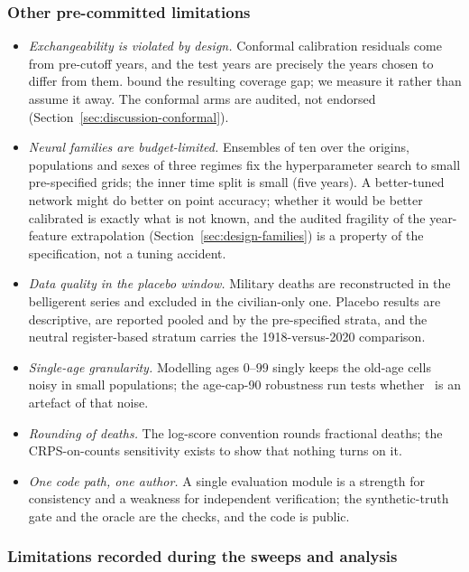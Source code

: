 \subsubsection{Other pre-committed limitations}

\begin{itemize}
\item \emph{Exchangeability is violated by design.} Conformal calibration
  residuals come from pre-cutoff years, and the test years are precisely
  the years chosen to differ from them. \citet{barber2023conformal} bound
  the resulting coverage gap; we measure it rather than assume it away.
  The conformal arms are audited, not endorsed
  (Section~\ref{sec:discussion-conformal}).
\item \emph{Neural families are budget-limited.} Ensembles of ten over
  the origins, populations and sexes of three regimes fix the
  hyperparameter search to small pre-specified grids; the inner time split
  is small (five years). A better-tuned network might do better on point
  accuracy; whether it would be better calibrated is exactly what is not
  known, and the audited fragility of the year-feature extrapolation
  (Section~\ref{sec:design-families}) is a property of the specification,
  not a tuning accident.
\item \emph{Data quality in the placebo window.} Military deaths are
  reconstructed in the belligerent series and excluded in the
  civilian-only one. Placebo results are descriptive, are reported pooled
  and by the pre-specified strata, and the neutral register-based stratum
  carries the 1918-versus-2020 comparison.
\item \emph{Single-age granularity.} Modelling ages $0$--$99$ singly keeps
  the old-age cells noisy in small populations; the age-cap-90 robustness
  run tests whether \Hfour\ is an artefact of that noise.
\item \emph{Rounding of deaths.} The log-score convention rounds fractional
  deaths; the CRPS-on-counts sensitivity exists to show that nothing turns
  on it.
\item \emph{One code path, one author.} A single evaluation module is a
  strength for consistency and a weakness for independent verification;
  the synthetic-truth gate and the  oracle are the checks, and
  the code is public.
\end{itemize}

\subsubsection{Limitations recorded during the sweeps and analysis}

